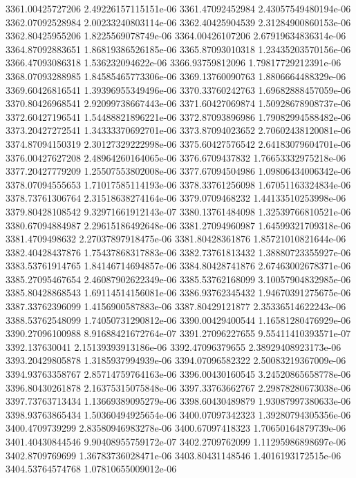 {3361.00425727206 2.49226157115151e-06
3361.47092452984 2.43057549480194e-06
3362.07092528984 2.00233240803114e-06
3362.40425904539 2.31284900860153e-06
3362.80425955206 1.8225569078749e-06
3364.00426107206 2.67919634836314e-06
3364.87092883651 1.86819386526185e-06
3365.87093010318 1.23435203570156e-06
3366.47093086318 1.536232094622e-06
3366.93759812096 1.79817729212391e-06
3368.07093288985 1.84585465773306e-06
3369.13760090763 1.8806664488329e-06
3369.60426816541 1.39396955349496e-06
3370.33760242763 1.69682888457059e-06
3370.80426968541 2.92099738667443e-06
3371.60427069874 1.50928678908737e-06
3372.60427196541 1.54488821896221e-06
3372.87093896986 1.79082994588482e-06
3373.20427272541 1.34333370692701e-06
3373.87094023652 2.70602438120081e-06
3374.87094150319 2.30127329222998e-06
3375.60427576542 2.64183079604701e-06
3376.00427627208 2.48964260164065e-06
3376.6709437832 1.76653332975218e-06
3377.20427779209 1.25507553802008e-06
3377.67094504986 1.09806434006342e-06
3378.07094555653 1.71017585114193e-06
3378.33761256098 1.67051163324834e-06
3378.73761306764 2.31518638274164e-06
3379.0709468232 1.44133510253998e-06
3379.80428108542 9.32971661912143e-07
3380.13761484098 1.32539766810521e-06
3380.67094884987 2.29615186492648e-06
3381.27094960987 1.64599321709318e-06
3381.4709498632 2.27037897918475e-06
3381.80428361876 1.85721010821644e-06
3382.40428437876 1.75437868317883e-06
3382.73761813432 1.38880723355927e-06
3383.53761914765 1.84146714694857e-06
3384.80428741876 2.67463002678371e-06
3385.27095467654 2.46087902622349e-06
3385.53762168099 3.10057904832985e-06
3385.80428868543 1.69114514156081e-06
3386.93762345432 1.94670391275675e-06
3387.33762396099 1.4156900587883e-06
3387.80429121877 2.35336514622243e-06
3388.53762548099 1.74050731290812e-06
3390.00429400544 1.16581280476929e-06
3390.27096100988 8.91688421672764e-07
3391.27096227655 9.55411410393571e-07
3392.137630041 2.15139393913186e-06
3392.47096379655 2.38929408923173e-06
3393.20429805878 1.3185937994939e-06
3394.07096582322 2.50083219367009e-06
3394.93763358767 2.85714759764163e-06
3396.00430160545 3.24520865658778e-06
3396.80430261878 2.16375315075848e-06
3397.33763662767 2.29878280673038e-06
3397.73763713434 1.13669389095279e-06
3398.60430489879 1.93087997380633e-06
3398.93763865434 1.50360494925654e-06
3400.07097342323 1.39280794305356e-06
3400.4709739299 2.83580946983278e-06
3400.67097418323 1.70650164879739e-06
3401.40430844546 9.90408955759172e-07
3402.2709762099 1.11295986898697e-06
3402.8709769699 1.36783736028471e-06
3403.80431148546 1.4016193172515e-06
3404.53764574768 1.07810655009012e-06
}
